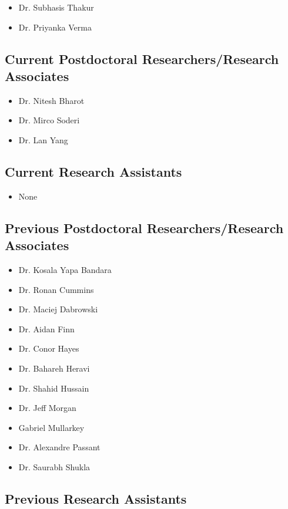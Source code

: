\documentclass[10pt,a4paper]{res} %
\begin{document}
\begin{resume}
\begin{itemize} \itemsep -2pt
\item Dr. Subhasis Thakur
\item Dr. Priyanka Verma
\end{itemize}

\subsection*{Current Postdoctoral Researchers/Research Associates}

\begin{itemize} \itemsep -2pt
\item Dr. Nitesh Bharot
\item Dr. Mirco Soderi
\item Dr. Lan Yang
\end{itemize}

\subsection*{Current Research Assistants}

\begin{itemize} \itemsep -2pt
\item None
\end{itemize}

\subsection*{Previous Postdoctoral Researchers/Research Associates}

\begin{itemize} \itemsep -2pt
\item Dr. Kosala Yapa Bandara
\item Dr. Ronan Cummins
\item Dr. Maciej Dabrowski
\item Dr. Aidan Finn
\item Dr. Conor Hayes
\item Dr. Bahareh Heravi
\item Dr. Shahid Hussain
\item Dr. Jeff Morgan
\item Gabriel Mullarkey
\item Dr. Alexandre Passant
\item Dr. Saurabh Shukla
\end{itemize}

\subsection*{Previous Research Assistants}


\end{resume}
\end{document}
